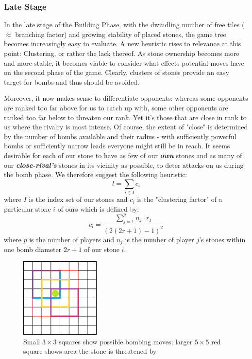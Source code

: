 \documentclass[a4paper,12pt]{article}
\begin{document}
\subsubsection{Late Stage}
In the late stage of the Building Phase, with the dwindling number of free tiles ($\approx$ branching factor) and growing stability of placed stones, the game tree becomes increasingly easy to evaluate. A new heuristic rises to relevance at this point: Clustering, or rather the lack thereof. As stone ownership becomes more and more stable, it becomes viable to consider what effects potential moves have on the second phase of the game. Clearly, clusters of stones provide an easy target for bombs and thus should be avoided. 

Moreover, it now makes sense to differentiate opponents: whereas some opponents are ranked too far above for us to catch up with, some other opponents are ranked too far below to threaten our rank. Yet it's those that are close in rank to us where the rivalry is most intense. Of course, the extent of "close" is determined by the number of bombs available and their radius - with sufficiently powerful bombs or sufficiently narrow leads everyone might still be in reach. It seems desirable for each of our stone to have as few of our \textbf{\textit{own}} stones and as many of our \textbf{\textit{close-rival's}} stones in its vicinity as possible, to deter attacks on us during the bomb phase. We therefore suggest the following heuristic:
\[ l = \sum\limits_{i \in I} c_i \]
where $I$ is the index set of our stones and $c_i$ is the "clustering factor" of a particular stone $i$ of ours which is defined by: 
\[c_i = \frac{\sum\limits_{j=1}^p n_j \cdot r_j}{(2(2r+1)-1)^2}\]
where $p$ is the number of players and $n_j$ is the number of player $j$'s stones within one bomb diameter $2r+1$ of our stone $i$. 

\begin{figure}[H]
    \centering
    \includegraphics[height=4cm]{pictures/assignment1/Bombing.png}
    \caption{Small $3 \times 3$ squares show possible bombing moves; larger $5 \times 5$ red square shows area the stone is threatened by}
    \label{fig:Bombing Diameter}
\end{figure}
\end{document}
